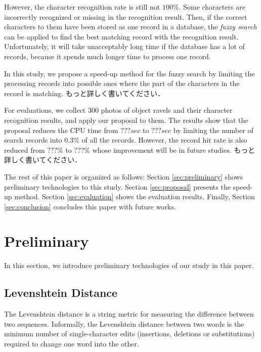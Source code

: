 \documentclass[technicalreport]{ieicej}
\begin{document}
    However, the character recognition rate is still not $100\%$. Some characters are incorrectly recognized or missing in the recognition result. Then, if the correct characters to them have been stored as one record in a database, the {\em fuzzy search} can be applied to find the best matching record with the recognition result. Unfortunately, it will take unacceptably long time if the database has a lot of records, because it spends much longer time to process one record. 

    In this study, we propose a speed-up method for the fuzzy search by limiting the processing records into possible ones where the part of the characters in the record is matching. 
    もっと詳しく書いてください．

    For evaluations, we collect 300 photos of object ravels and their character recognition results, and apply our proposal to them. The results show that the proposal reduces the CPU time from $???sec$ to $???sec$ by limiting the number of search records into 0.3\% of all the records. However, the record hit rate is also reduced from $???\%$ to $???\%$ whose improvement will be in future studies.
    もっと詳しく書いてください．

    The rest of this paper is organized as follows:
    Section \ref{sec:preliminary} shows preliminary technologies to this study.
    Section \ref{sec:proposal} presents the speed-up method.
    Section \ref{sec:evaluation} shows the evaluation results.
    Finally, Section \ref{sec:conclusion} concludes this paper with future works.


\section{Preliminary}
\label{sec:efp}
    In this section, we introduce preliminary technologies of our study in this paper.

    \subsection{Levenshtein Distance}
        The Levenshtein distance is a string metric for measuring the difference between two sequences. Informally, the Levenshtein distance between two words is the minimum number of single-character edits (insertions, deletions or substitutions) required to change one word into the other.
\end{document}
